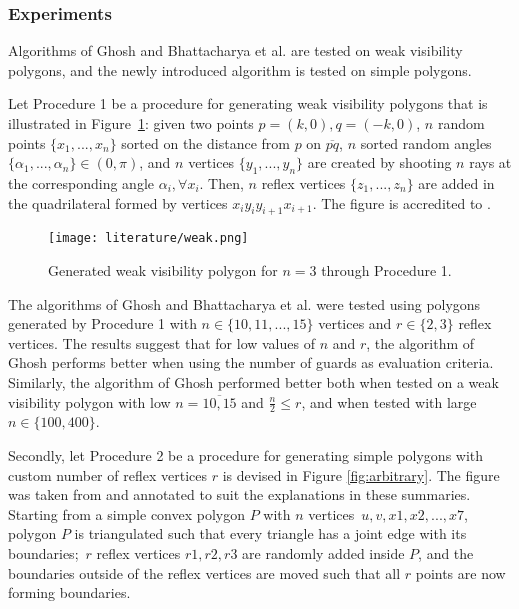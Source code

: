 \subsubsection{Experiments}
Algorithms of Ghosh \cite{GHOSH2010718} and Bhattacharya et al. \cite{bhattacharya2016approximability} are tested on weak visibility polygons, and the newly introduced algorithm is tested on simple polygons. 

Let Procedure 1 be a procedure for generating weak visibility polygons that is illustrated in Figure~\ref{fig:weak}: given two points $p = (k, 0), q = (-k, 0)$,  $n$ random points $\{x_1, ..., x_n\}$ sorted on the distance from $p$ on $\overline{pq}$, $n$ sorted random angles $\{\alpha_1, ..., \alpha_n\} \in  (0, \pi)$, and $n$ vertices $\{y_1, ..., y_n\}$ are created by shooting $n$ rays at the corresponding angle $\alpha_i, \forall x_i$. Then, $n$ reflex vertices $\{z_1, ..., z_n\}$ are added in the quadrilateral formed by vertices $x_iy_iy_{i + 1}x_{i + 1}$. The figure is accredited to \cite{maleki2022implementation}.

\begin{figure}[h!]
    \centering
    \texttt{[image: literature/weak.png]}
    \caption{Generated weak visibility polygon for $n = 3$ \cite{maleki2022implementation} through Procedure 1.}
    \label{fig:weak}
\end{figure}

The algorithms of Ghosh \cite{GHOSH2010718} and Bhattacharya et al. \cite{bhattacharya2016approximability} were tested using polygons generated by Procedure 1 with $n \in \{10, 11, ..., 15\}$ vertices and $r \in \{2, 3\}$ reflex vertices. The results suggest that for low values of $n$ and $r$, the algorithm of Ghosh \cite{GHOSH2010718} performs better when using the number of guards as evaluation criteria. 
Similarly, the algorithm of Ghosh \cite{GHOSH2010718} performed better both when tested on a weak visibility polygon with low $n = \overline{10, 15}$ and $\frac n 2 \leq r$, and when tested with large $n \in \{100, 400\}$.

Secondly, let Procedure 2 be a procedure for generating simple polygons with custom number of reflex vertices $r$ is devised in Figure \ref{fig:arbitrary}. The figure was taken from \cite{maleki2022implementation} and annotated to suit the explanations in these summaries. Starting from a simple convex polygon $P$ with $n$ vertices~$u, v, x1, x2, ..., x7$, polygon $P$ is triangulated such that every triangle has a joint edge with its boundaries;~$r$ reflex vertices $r1, r2, r3$ are randomly added inside $P$, and the boundaries outside of the reflex vertices are moved such that all $r$ points are now forming boundaries. 

